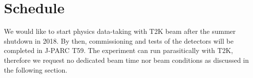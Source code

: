 \section{Schedule}
We would like to start physics data-taking with T2K beam after the summer shutdown in 2018.
By then, commissioning and tests of the detectors will be completed in J-PARC T59.
The experiment can run parasitically with T2K, therefore we request no dedicated beam time nor beam conditions as discussed in the following section.

